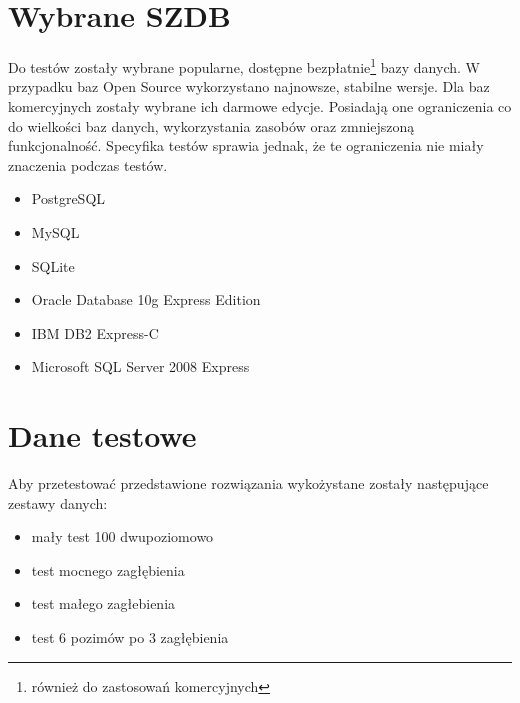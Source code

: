 \section{Wybrane SZDB}

Do testów zostały wybrane popularne, dostępne bezpłatnie\footnote{również do zastosowań komercyjnych} bazy danych. 
W przypadku baz Open Source wykorzystano najnowsze, stabilne wersje.
Dla baz komercyjnych zostały wybrane ich darmowe edycje. 
Posiadają one ograniczenia co do wielkości baz danych, wykorzystania zasobów oraz zmniejszoną funkcjonalność. 
Specyfika testów sprawia jednak, że te ograniczenia nie miały znaczenia podczas testów.


\begin{itemize}
 \item PostgreSQL
 \item MySQL
 \item SQLite
 \item Oracle Database 10g Express Edition
 \item IBM DB2 Express-C
 \item Microsoft SQL Server 2008 Express
\end{itemize}







% 



\section{Dane testowe}



Aby przetestować przedstawione rozwiązania wykożystane zostały następujące zestawy danych:
\begin{itemize}
 \item mały test 100 dwupoziomowo
 \item test mocnego zagłębienia
 \item test małego zagłebienia
 \item test 6 pozimów po 3 zagłębienia 
\end{itemize}


